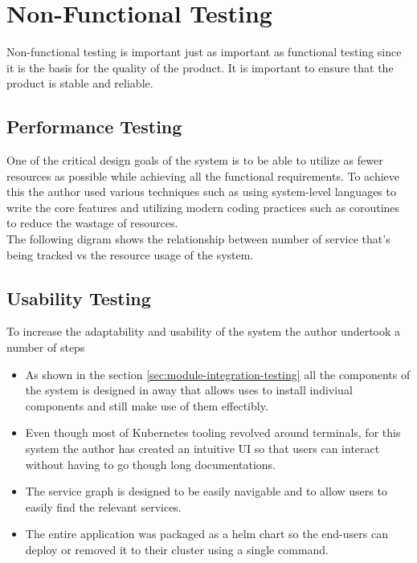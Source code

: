 \section{Non-Functional Testing}

Non-functional testing is important just as important as functional testing since it is the basis for the quality of the product. It is important to ensure that the product is stable and reliable.

\subsection{Performance Testing}

One of the critical design goals of the system is to be able to utilize as fewer resources as possible while achieving all the functional requirements. To achieve this the author used various techniques such as using system-level languages to write the core features and utilizing modern coding practices such as coroutines to reduce the wastage of resources.\\

\noindent The following digram shows the relationship between number of service that's being tracked vs the resource usage of the system.\\[6cm]


\subsection{Usability Testing}

To increase the adaptability and usability of the system the author undertook a number of steps

\begin{itemize}
    \item As shown in the section \ref{sec:module-integration-testing} all the components of the system is designed in away that allows uses to install indiviual components and still make use of them effectibly.
    \item Even though most of Kubernetes tooling revolved around terminals, for this system the author has created an intuitive UI so that users can interact without having to go though long documentations.
    \item The service graph is designed to be easily navigable and to allow users to easily find the relevant services.
    \item The entire application was packaged as a helm chart so the end-users can deploy or removed it to their cluster using a single command.

\end{itemize}

